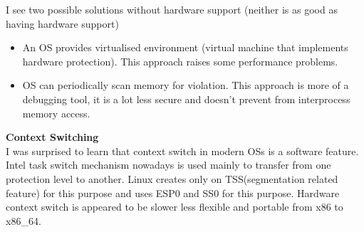 \documentclass{article}
\begin{document}
        I see two possible solutions without hardware support (neither is as good as
        having hardware support)
        \begin{itemize}
            \item An OS provides virtualised environment (virtual machine that implements
                hardware protection). This approach raises some performance problems.
            \item OS can periodically scan memory for violation. This approach is more of
                a debugging tool, it is a lot less secure and doesn't prevent from interprocess 
                memory access.
        \end{itemize}

        \textbf{Context Switching}\\
        
        I was surprised to learn that context switch in modern OSs is a software
        feature. Intel task switch mechanism nowadays is used mainly to transfer from one
        protection level to another. Linux creates only on TSS(segmentation related
        feature) for this purpose and uses
        ESP0 and SS0 for this purpose. Hardware context switch is appeared to be slower
        less flexible and portable from x86 to x86\_64.\\



\end{document}
